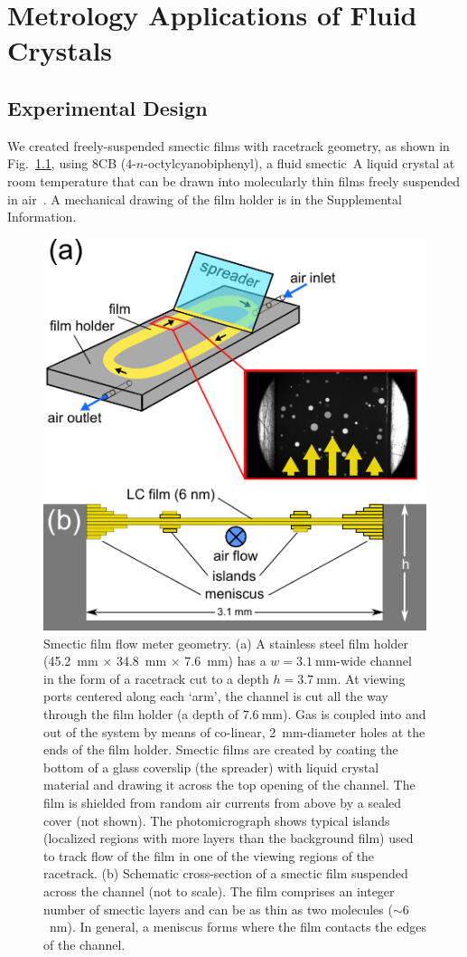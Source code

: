 \documentclass[aagreenthesis]{subfiles}
\begin{document}
\chapter{Metrology Applications of Fluid Crystals}
\section{Experimental Design}

We created freely-suspended
smectic films with racetrack geometry, as shown in Fig.~\ref{fig:geometry},  using $8$CB ($4$-$n$-octylcyanobiphenyl), a fluid
smectic~A  liquid crystal  at room temperature that can be drawn into molecularly thin films freely suspended in
air~\cite{YoungLightScatteringStudyTwoDimensional1978,RosenblattFreelySuspendedFerroelectric1979,PindakTwodimensionalsystems1982}.
A mechanical drawing of the film holder is in the Supplemental Information.
%
\begin{figure}[H]
\centering
\includegraphics[keepaspectratio=true,width=.6\textwidth]{./figs/racetrack/intro/Figure1.pdf}
\caption{Smectic film flow meter geometry. (a) A stainless steel film holder
    (\SI{45.2}{\milli\metre} $\times$ \SI{34.8}{\milli\metre} $\times$ \SI{7.6}{mm})
    has a $w=\SI{3.1}{\milli\metre}$-wide channel in the form of a racetrack cut to a
    depth $h=\SI{3.7}{\milli\metre}$. At
    viewing ports centered along each `arm', the channel is cut all the way through the film holder
    (a depth of $\SI{7.6}{\milli\metre}$). Gas is coupled into and out of the system by
    means of co-linear, \SI{2}{\milli\metre}-diameter holes at the ends of the film holder. Smectic films are created by
    coating the bottom of a glass coverslip (the spreader) with liquid crystal material and
    drawing it across the top opening of the channel.
    The film is shielded from random air currents from above by a sealed cover (not shown).
    The photomicrograph shows
    typical islands (localized regions with more layers than the background film) used to track flow of the film in one of the viewing regions of the racetrack. (b) Schematic cross-section of
    a smectic film suspended across the channel (not to scale). The film
    comprises an integer number of smectic layers and can be as thin as two
    molecules ($\sim 6$~nm).  In general, a meniscus forms where the film contacts
    the edges of the channel.}
\label{fig:geometry}
\end{figure}
\end{document}
